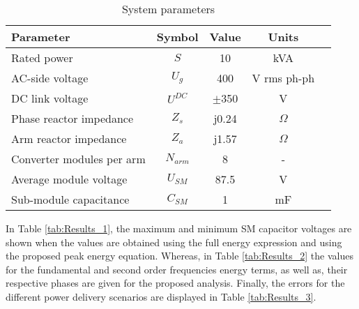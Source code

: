 \documentclass[journal]{IEEEtran}
\begin{document}
\begin{table}[ht]
\caption{System parameters}\renewcommand\arraystretch{1} 
\begin{tabular}[c]{lcccl}
\hline\hline
\textbf{Parameter}                   & \textbf{Symbol} & \textbf{Value} & \textbf{Units}     \\ \hline
Rated power                          & $S$               & 10           & kVA                \\
AC-side voltage                      & $U_g$               & 400            & V rms ph-ph \\
DC link voltage                    & $U^{DC}$             & $\pm$350           & V  \\
Phase reactor impedance              & $Z_s$          & j0.24        & $\Omega$                 \\
Arm reactor impedance                & $Z_a$             & j1.57     & $\Omega$                                \\
Converter modules per arm            & $N_{arm}$            & 8            & -                  \\
Average module voltage               & $U_{SM}$         & 87.5            & V                \\
Sub-module capacitance               & $C_{SM}$         & 1            & mF                \\
\hline\hline
\end{tabular}
\label{tab:param_v2}
\end{table}


In Table \ref{tab:Results_1}, the maximum and minimum SM capacitor voltages are shown when the values are obtained using the full energy expression and using the proposed peak energy equation. Whereas, in Table \ref{tab:Results_2} the values for the fundamental and second order frequencies energy terms, as well as, their respective phases are given for the proposed analysis. Finally, the errors for the different power delivery scenarios are displayed in Table \ref{tab:Results_3}. 
\end{document}
